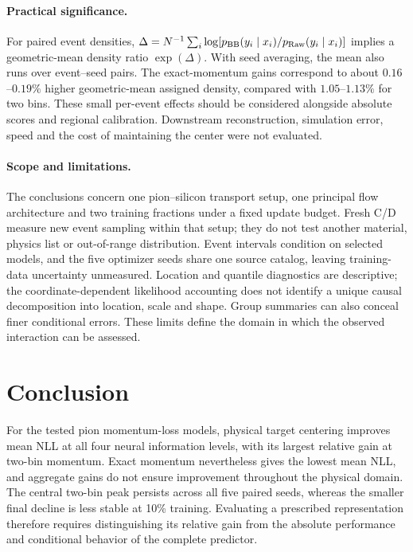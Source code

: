 \documentclass[11pt]{article}
\newcommand{\raw}{\mathrm{Raw}}
\begin{document}
\paragraph{Practical significance.}
For paired event densities,
$\Delta=N^{-1}\sum_i\log[p_{\rm BB}(y_i\mid x_i)/p_{\raw}(y_i\mid x_i)]$
implies a geometric-mean density ratio $\exp(\Delta)$. With seed averaging,
the mean also runs over event--seed pairs. The exact-momentum gains correspond
to about $0.16$--$0.19\%$ higher geometric-mean assigned density, compared
with $1.05$--$1.13\%$ for two bins. These small per-event effects should be
considered alongside absolute scores and regional calibration. Downstream
reconstruction, simulation error, speed and the cost of maintaining the
center were not evaluated.

\paragraph{Scope and limitations.}
The conclusions concern one pion--silicon transport setup, one principal
flow architecture and two training fractions under a fixed update budget.
Fresh C/D measure new event sampling within that setup; they do not test
another material, physics list or out-of-range distribution. Event intervals
condition on selected models, and the five optimizer seeds share one source
catalog, leaving training-data uncertainty unmeasured. Location and quantile
diagnostics are descriptive; the coordinate-dependent likelihood accounting
does not identify a unique causal decomposition into location, scale and
shape. Group summaries can also conceal finer conditional errors. These
limits define the domain in which the observed interaction can be assessed.

\section{Conclusion}

For the tested pion momentum-loss models, physical target centering improves
mean NLL at all four neural information levels, with its largest relative
gain at two-bin momentum. Exact momentum nevertheless gives the lowest mean NLL, and aggregate gains do not ensure improvement throughout the
physical domain. The central two-bin peak persists across all five paired
seeds, whereas the smaller final decline is less stable at 10\% training.
Evaluating a prescribed representation therefore requires distinguishing its
relative gain from the absolute performance and conditional behavior of the
complete predictor.
\end{document}
